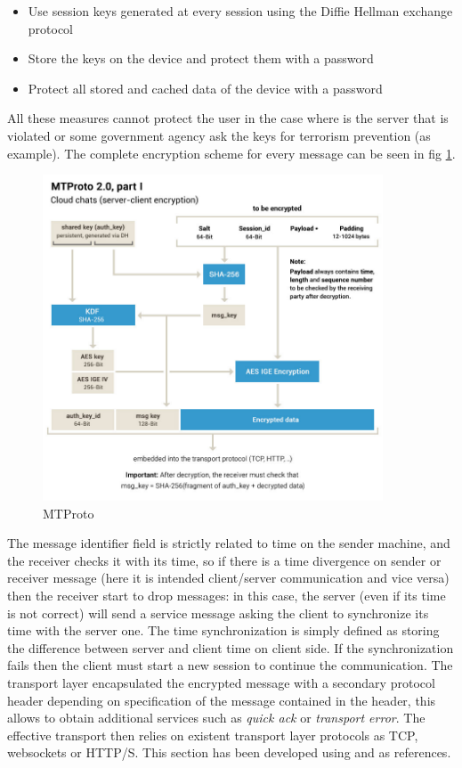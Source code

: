 \documentclass{article}
\begin{document}
\begin{itemize}
	\item Use session keys generated at every session using the Diffie Hellman exchange protocol
	\item Store the keys on the device and protect them with a password
	\item Protect all stored and cached data of the device with a password
\end{itemize}

All these measures cannot protect the user in the case where is the server that is violated or some government agency ask the keys for terrorism prevention (as example). The complete encryption scheme for every message can be seen in fig \ref{fig:MTProto}.

\begin{figure}[H]
	\centering
	\includegraphics[width=0.9\textwidth]{images/mt_p1.jpg}
	\caption{MTProto}
	\label{fig:MTProto}
\end{figure}

The message identifier field is strictly related to time on the sender machine, and the receiver checks it with its time, so if there is a time divergence on sender or receiver message (here it is intended client/server communication and vice versa) then the receiver start to drop messages: in this case, the server (even if its time is not correct) will send a service message asking the client to synchronize its time with the server one. The time synchronization is simply defined as storing the difference between server and client time on client side. If the synchronization fails then the client must start a new session to continue the communication.\newline
The transport layer encapsulated the encrypted message with a secondary protocol header depending on specification of the message contained in the header, this allows to obtain additional services such as \textit{quick ack} or \textit{transport error}. The effective transport then relies on existent transport layer protocols as TCP, websockets or HTTP/S.\newline
This section has been developed using \cite{MTProto} and \cite{tel_wiki} as references.
\end{document}
